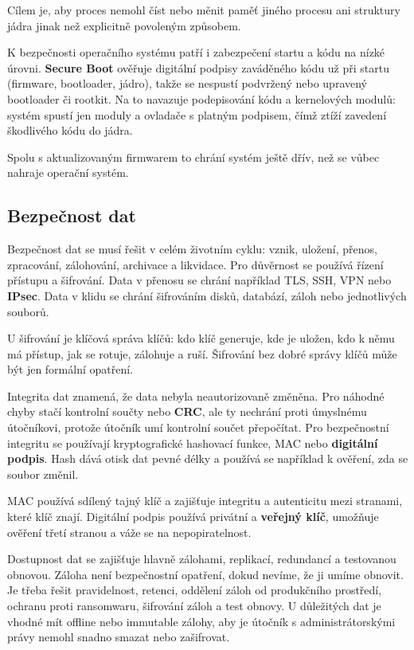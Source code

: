 Cílem je, aby proces nemohl číst nebo měnit paměť jiného procesu ani struktury jádra jinak než explicitně povoleným způsobem.

K bezpečnosti operačního systému patří i zabezpečení startu a kódu na nízké úrovni. \textbf{Secure Boot} ověřuje digitální podpisy zaváděného kódu už při startu (firmware, bootloader, jádro), takže se nespustí podvržený nebo upravený bootloader či rootkit. Na to navazuje podepisování kódu a kernelových modulů: systém spustí jen moduly a ovladače s platným podpisem, čímž ztíží zavedení škodlivého kódu do jádra.

Spolu s aktualizovaným firmwarem to chrání systém ještě dřív, než se vůbec nahraje operační systém.

\subsection*{Bezpečnost dat}

Bezpečnost dat se musí řešit v celém životním cyklu: vznik, uložení, přenos, zpracování, zálohování, archivace a likvidace. Pro důvěrnost se používá řízení přístupu a šifrování. Data v přenosu se chrání například TLS, SSH, VPN nebo \textbf{IPsec}. Data v klidu se chrání šifrováním disků, databází, záloh nebo jednotlivých souborů.

U šifrování je klíčová správa klíčů: kdo klíč generuje, kde je uložen, kdo k němu má přístup, jak se rotuje, zálohuje a ruší. Šifrování bez dobré správy klíčů může být jen formální opatření.

Integrita dat znamená, že data nebyla neautorizovaně změněna. Pro náhodné chyby stačí kontrolní součty nebo \textbf{CRC}, ale ty nechrání proti úmyslnému útočníkovi, protože útočník umí kontrolní součet přepočítat. Pro bezpečnostní integritu se používají kryptografické hashovací funkce, MAC nebo \textbf{digitální podpis}. Hash dává otisk dat pevné délky a používá se například k ověření, zda se soubor změnil.

MAC používá sdílený tajný klíč a zajišťuje integritu a autenticitu mezi stranami, které klíč znají. Digitální podpis používá privátní a \textbf{veřejný klíč}, umožňuje ověření třetí stranou a váže se na nepopiratelnost.

Dostupnost dat se zajišťuje hlavně zálohami, replikací, redundancí a testovanou obnovou. Záloha není bezpečnostní opatření, dokud nevíme, že ji umíme obnovit. Je třeba řešit pravidelnost, retenci, oddělení záloh od produkčního prostředí, ochranu proti ransomwaru, šifrování záloh a test obnovy. U důležitých dat je vhodné mít offline nebo immutable zálohy, aby je útočník s administrátorskými právy nemohl snadno smazat nebo zašifrovat.

